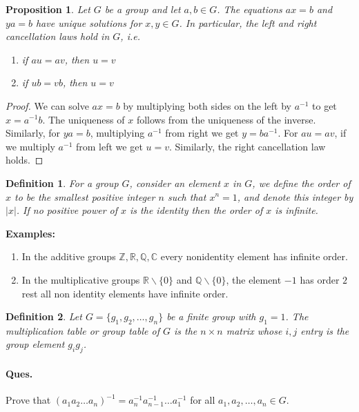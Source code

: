 \documentclass[12pt]{report}
\newtheorem{defn}{Definition}
\newtheorem{prop}{Proposition}
\begin{document}
\begin{prop}
    Let $G$ be a group and let $a,b \in G$. The equations $ax = b$ and $ya = b$ have unique solutions for $x, y \in G$. In particular, the left and right cancellation laws hold in $G$, i.e.
    \begin{enumerate}
        \item if $au = av$, then $u = v$
        \item if $ub = vb$, then $u = v$ 
    \end{enumerate}
\end{prop}
\begin{proof}
    We can solve $ax = b$ by multiplying both sides on the left by $a^{-1}$ to get $x = a^{-1}b$. The uniqueness of $x$ follows from the uniqueness of the inverse. Similarly, for $ya = b$, multiplying $a^{-1}$ from right we get $y = ba^{-1}$. For $au = av$, if we multiply $a^{-1}$ from left we get $u = v$. Similarly, the right cancellation law holds.
\end{proof}
\begin{defn}
    For a group $G$, consider an element $x$ in $G$, we define the order of $x$ to be the smallest positive integer $n$ such that $x^n = 1$, and denote this integer by $|x|$.
    If no positive power of $x$ is the identity then the order of $x$ is infinite.
\end{defn}
\textbf{Examples:}
\begin{enumerate}
    \item In the additive groups $\mathbb{Z},\mathbb{R},\mathbb{Q},\mathbb{C}$ every nonidentity element has infinite order.
    \item In the multiplicative groups $\mathbb{R}\backslash\{0\}$ and $\mathbb{Q}\backslash\{0\}$, the element $-1$ has order $2$ rest all non identity elements have infinite order.
\end{enumerate}
\begin{defn}
    Let $G = \{g_1, g_2, \dots, g_n\}$ be a finite group with $g_1 = 1$. The multiplication table or group table of $G$ is the $n\times n$ matrix whose $i, j$ entry is the group element $g_ig_j$.
\end{defn}
\paragraph*{Ques. } Prove that $(a_1 a_2 \dots a_n)^{-1} = a_n^{-1} a_{n-1}^{-1} \dots a_1^{-1}$ for all $a_1, a_2, \dots, a_n \in G$.
\end{document}
